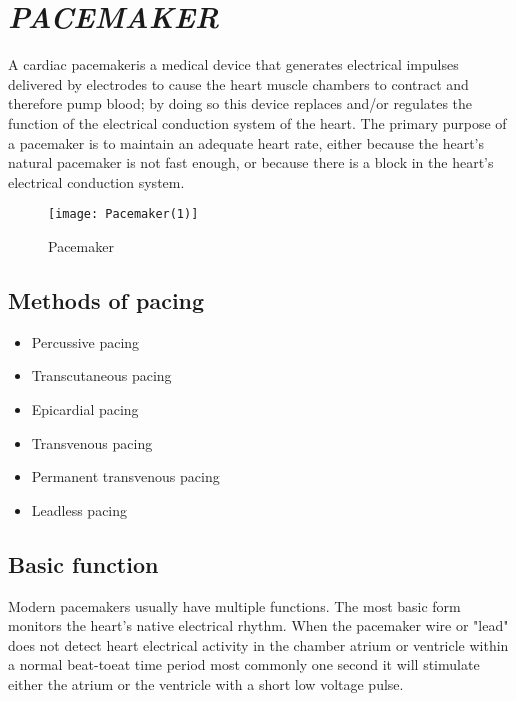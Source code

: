 \documentclass[12pt]{article}
\begin{document}




\tableofcontents


\section {\textsl{PACEMAKER}}


A cardiac pacemakeris a medical device that generates electrical impulses delivered by electrodes to cause the heart muscle chambers to contract and therefore pump blood; by doing so this device replaces and/or regulates the function of the electrical conduction system of the heart.
\newline\newline
The primary purpose of a pacemaker is to maintain an adequate heart rate, either because the heart's natural pacemaker is not fast enough, or because there is a block in the heart's electrical conduction system.

\begin{figure}
\centering
\texttt{[image: Pacemaker(1)]}
\caption{Pacemaker}
\end{figure}

\subsection{Methods of pacing}
\begin{itemize}
\item Percussive pacing
\item Transcutaneous pacing
\item Epicardial pacing
\item Transvenous pacing
\item Permanent transvenous pacing
\item Leadless pacing
\end{itemize}

\subsection{Basic function}

Modern pacemakers usually have multiple functions. The most basic form monitors the heart's native electrical rhythm. When the pacemaker wire or "lead" does not detect heart electrical activity in the chamber atrium or ventricle within a normal beat-toeat time period most commonly one second it will stimulate either the atrium or the ventricle with a short low voltage pulse.
\end{document}
